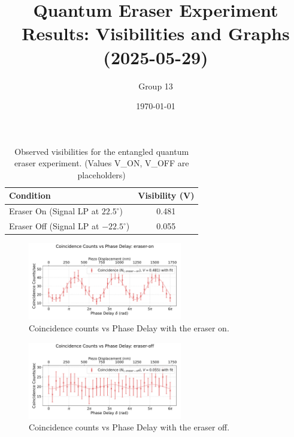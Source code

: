 \documentclass{article}
\title{Quantum Eraser Experiment Results: Visibilities and Graphs (2025-05-29)}
\author{Group 13} %
\date{\today}
\begin{document}
\pagestyle{empty} %

\begin{table}[h!]
\centering
\begin{tabular}{lc}
\toprule
\textbf{Condition} & \textbf{Visibility (V)} \\
\midrule
Eraser On (Signal LP at $22.5^\circ$)          & 0.481 \\
Eraser Off (Signal LP at $-22.5^\circ$) & 0.055 \\
\bottomrule
\end{tabular}
\caption{Observed visibilities for the entangled quantum eraser experiment. (Values V\_ON, V\_OFF are placeholders)}
\end{table}


\begin{figure}[h!]
\centering
\includegraphics[width=0.6\textwidth]{coincidence_counts_eraser_on.pdf}
\caption{Coincidence counts vs Phase Delay with the eraser on.}
\end{figure}


\begin{figure}[h!]
\centering
\includegraphics[width=0.6\textwidth]{coincidence_counts_eraser_off.pdf}
\caption{Coincidence counts vs Phase Delay with the eraser off.}
\end{figure}
\end{document}
